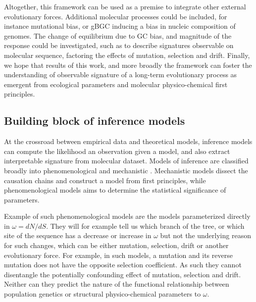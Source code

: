Altogether, this framework can be used as a premise to integrate other external evolutionary forces.  %
Additional molecular processes could be included, for instance mutational bias, or \gls{gBGC} inducing a bias in nucleic composition of genomes. 
The change of equilibrium due to GC bias, and magnitude of the response could be investigated, such as to describe signatures observable on molecular sequence, factoring the effects of mutation, selection and drift.
Finally, we hope that results of this work, and more broadly the framework can foster the understanding of observable signature of a long-term evolutionary process as emergent from ecological parameters and molecular physico-chemical first principles.

\subsection{Building block of inference models}

At the crossroad between empirical data and theoretical models, inference models can compute the \gls{likelihood} an observation given a model, and also extract interpretable signature from molecular dataset.
Models of inference are classified broadly into phenomenological and mechanistic \citep{Rodrigue2010a}.
Mechanistic models dissect the causation chains and construct a model from first principles, while phenomenological models aims to determine the statistical significance of parameters.

Example of such phenomenological models are the models parameterized directly in $\omega = dN/dS$.
They will for example tell us which branch of the tree, or which site of the sequence has a decrease or increase in $\omega$ but not the underlying reason for such changes, which can be either mutation, selection, drift or another evolutionary force.
For example, in such models, a mutation and its reverse mutation does not have the opposite selection coefficient.
As such they cannot disentangle the potentially confounding effect of mutation, selection and drift.
Neither can they predict the nature of the functional relationship between population genetics or structural physico-chemical parameters to $\omega$.

